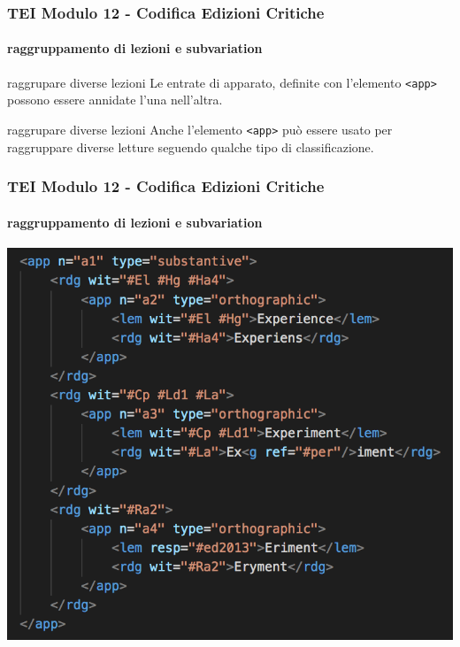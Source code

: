 \begin{frame}
    \frametitle{TEI Modulo 12 - Codifica Edizioni Critiche}
    \framesubtitle{raggruppamento di lezioni e subvariation}
    \addtocounter{nframe}{1}

  

    \begin{block}{raggrupare diverse lezioni}
       Le entrate di apparato, definite con l'elemento \texttt{<app>}  possono essere annidate l'una nell'altra.
    \end{block}
    \begin{block}{raggrupare diverse lezioni}
        Anche l'elemento \texttt{<app>} può essere usato per raggruppare diverse letture seguendo qualche tipo di classificazione.
     \end{block}


\end{frame}



\begin{frame}
    \frametitle{TEI Modulo 12 - Codifica Edizioni Critiche}
    \framesubtitle{raggruppamento di lezioni e subvariation}
    \addtocounter{nframe}{1}
    

    \begin{center}
        \includegraphics[width=.95\textwidth]{imgs/nest-app.png}
    \end{center}


\end{frame}

